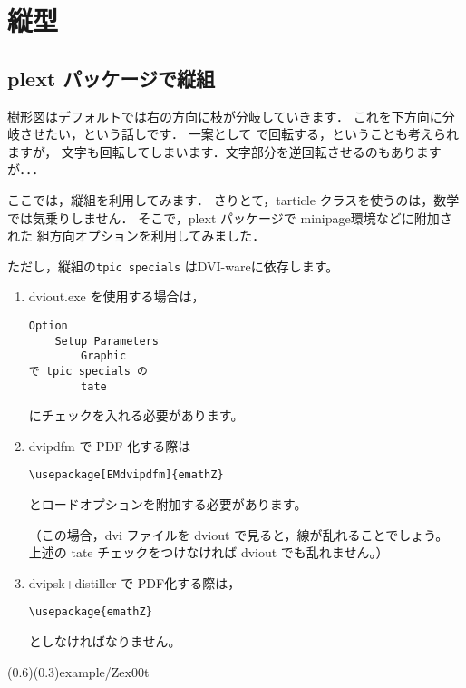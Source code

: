 \documentclass[a4j]{jarticle}
\begin{document}
\section{縦型}
\subsection{\textsf{plext} パッケージで縦組}
樹形図はデフォルトでは右の方向に枝が分岐していきます．
これを下方向に分岐させたい，という話しです．
一案として  で回転する，ということも考えられますが，
文字も回転してしまいます．文字部分を逆回転させるのもありますが．．．

ここでは，縦組を利用してみます．
さりとて，\textsf{tarticle} クラスを使うのは，数学では気乗りしません．
そこで，\textsf{plext} パッケージで \textsf{minipage}環境などに附加された
組方向オプションを利用してみました．

ただし，縦組の\verb+tpic specials+ はDVI-wareに依存します。

\begin{enumerate}[(1)]
  \item dviout.exe を使用する場合は，
\begin{jquote}
\begin{verbatim}
Option
    Setup Parameters
        Graphic
で tpic specials の
        tate
\end{verbatim}
\end{jquote}
にチェックを入れる必要があります。

  \item dvipdfm で PDF 化する際は
\begin{jquote}
\begin{verbatim}
\usepackage[EMdvipdfm]{emathZ}
\end{verbatim}
\end{jquote}
とロードオプションを附加する必要があります。

（この場合，dvi ファイルを dviout で見ると，線が乱れることでしょう。
上述の tate チェックをつけなければ dviout でも乱れません。）

  \item dvipsk+distiller で PDF化する際は，
\begin{jquote}
\begin{verbatim}
\usepackage{emathZ}
\end{verbatim}
\end{jquote}
としなければなりません。
\end{enumerate}

\showexample[基本例（縦）](0.6)(0.3){example/Zex00t}
\end{document}
